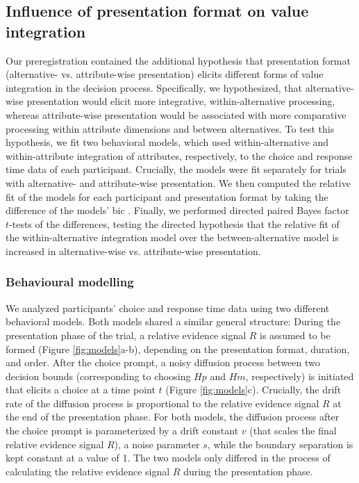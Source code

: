 \documentclass[11pt, a4paper, twocolumn, abstract]{scrartcl}
\begin{document}
\subsection*{Influence of presentation format on value integration}

Our preregistration contained the additional hypothesis that presentation format (alternative- vs. attribute-wise presentation) elicits different forms of value integration in the decision process. Specifically, we hypothesized, that alternative-wise presentation would elicit more integrative, within-alternative processing, whereas attribute-wise presentation would be associated with more comparative processing within attribute dimensions and between alternatives.
To test this hypothesis, we fit two behavioral models, which used within-alternative and within-attribute integration of attributes, respectively, to the choice and response time data of each participant. Crucially, the models were fit separately for trials with alternative- and attribute-wise presentation. We then computed the relative fit of the models for each participant and presentation format by taking the difference of the models’ \gls{bic} \parencite{schwarz1978EstimatingDimensionModel}. Finally, we performed directed paired Bayes factor $t$-tests of the differences, testing the directed hypothesis that the relative fit of the within-alternative integration model over the between-alternative model is increased in alternative-wise vs. attribute-wise presentation.

\subsubsection*{Behavioural modelling}

We analyzed participants' choice and response time data using two different behavioral models. Both models shared a similar general structure: During the presentation phase of the trial, a relative evidence signal $R$ is assumed to be formed (Figure \ref{fig:models}a-b), depending on the presentation format, duration, and order. After the choice prompt, a noisy diffusion process between two decision bounds (corresponding to choosing $Hp$ and $Hm$, respectively) is initiated that elicits a choice at a time point $t$ (Figure \ref{fig:models}c). Crucially, the drift rate of the diffusion process is proportional to the relative evidence signal $R$ at the end of the presentation phase. For both models, the diffusion process after the choice prompt is parameterized by a drift constant $v$ (that scales the final relative evidence signal $R$), a noise parameter $s$, while the boundary separation is kept constant at a value of 1.
The two models only differed in the process of calculating the relative evidence signal $R$ during the presentation phase.
\end{document}
